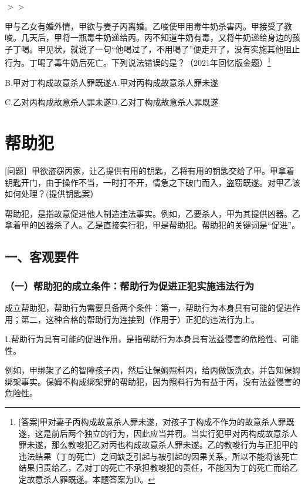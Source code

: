
\ensuremath{>}\ensuremath{>}

甲与乙女有婚外情，甲欲与妻子丙离婚。乙唆使甲用毒牛奶杀害丙。甲接受了教唆。几天后，甲将一瓶毒牛奶递给丙。丙不知道牛奶有毒，又将牛奶递给身边的孩子丁喝。甲见状，就说了一句“他喝过了，不用喝了”便走开了，没有实施其他阻止行为。丁喝了毒牛奶后死亡。下列说法错误的是？（2021年回忆版金题）\footnote{[答案]甲对妻子丙构成故意杀人罪未遂，对孩子丁构成不作为的故意杀人罪既遂，这是前后两个独立的行为，因此应当并罚。当实行犯甲对丙构成故意杀人罪未遂，那么教唆犯乙对丙也构成故意杀人罪未遂。乙的教唆行为与正犯甲的违法结果（丁的死亡）之间缺乏引起与被引起的因果关系，所以不能将该死亡结果归责给乙，乙对丁的死亡不承担教唆犯的责任，不能因为丁的死亡而给乙定故意杀人罪既遂。本题答案为D。}

B.甲对丁构成故意杀人罪既遂A.甲对丙构成故意杀人罪未遂

C.乙对丙构成故意杀人罪未遂D.乙对丁构成故意杀人罪既遂

\section{帮助犯}

[问题］甲欲盗窃丙家，让乙提供有用的钥匙，乙将有用的钥匙交给了甲。甲拿着钥匙开门，由于操作不当，一时打不开，情急之下破门而入，盗窃既遂。对甲乙该如何处理？(提供钥匙案）

帮助犯，是指故意促进他人制造违法事实。例如，乙要杀人，甲为其提供凶器。乙拿着甲的凶器杀了人。乙是直接实行犯，甲是帮助犯。帮助犯的关键词是“促进”。


\subsection*{一、客观要件}

\subsubsection*{（一）帮助犯的成立条件：帮助行为促进正犯实施违法行为}

成立帮助犯，帮助行为需要具备两个条件：第一，帮助行为本身具有可能的促进作用；第二，这种合格的帮助行为连接到（作用于）正犯的违法行为上。

1.帮助行为具有可能的促进作用，是指帮助行为本身具有法益侵害的危险性、可能性。

例如，甲绑架了乙的智障孩子丙，然后让保姆照料丙，给丙做饭洗衣，并告知保姆绑架事实。保姆不构成绑架罪的帮助犯，因为照料行为有益于丙，没有法益侵害的危险性。

